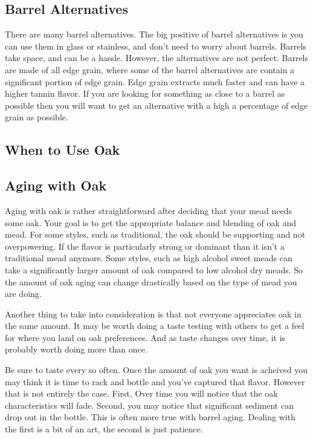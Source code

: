 
 \subsection{Barrel Alternatives}
  There are many barrel alternatives. The big positive of barrel alternatives is you can use them in glass
  or stainless, and don't need to worry about barrels. Barrels take space, and can be a hassle. However, the
  alternatives are not perfect. Barrels are made of all edge grain, where some of the barrel alternatives are
  contain a significant portion of edge grain. Edge grain extracts much faster and can have a higher tannin
  flavor. If you are looking for something as close to a barrel as possible then you will want to get an
  alternative with a high a percentage of edge grain as possible.

 \subsection{When to Use Oak}

 \subsection{Aging with Oak}
  Aging with oak is rather straightforward after deciding that your mead needs some oak. Your goal is to get the
  appropriate balance and blending of oak and mead. For some styles, such as traditional, the oak should be supporting
  and not overpowering. If the flavor is particularly strong or dominant than it isn't a traditional mead anymore.
  Some styles, such as high alcohol sweet meads can take a significantly larger amount of oak compared to low alcohol
  dry meads. So the amount of oak aging can change drastically based on the type of mead you are doing. 

  Another thing to take into consideration is that not everyone appreciates oak in the same amount. It may be worth
  doing a taste testing with others to get a feel for where you land on oak preferences. And as taste changes
  over time, it is probably worth doing more than once.

  Be sure to taste every so often. Once the amount of oak you want is acheived you may think it is time to rack
  and bottle and you've captured that flavor. However that is not entirely the case. 
  First, Over time you will notice that the oak characteristics will fade. Second, you may notice that
  significant sediment can drop out in the bottle. This is often more true with barrel aging. Dealing with the first
  is a bit of an art, the second is just patience.

